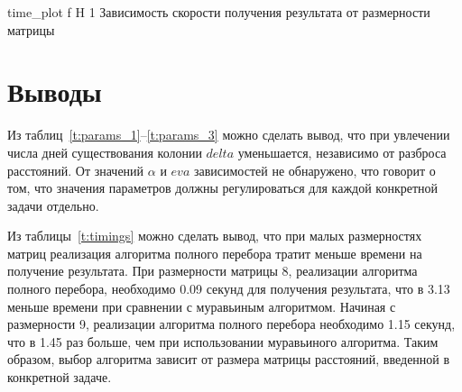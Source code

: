 {time_plot} %
{f} %
{H} %
{1\textwidth} %
{Зависимость скорости получения результата от размерности матрицы} %

\section*{Выводы}
Из таблиц~\ref{t:params_1}--\ref{t:params_3} можно сделать вывод, что при увлечении числа дней существования колонии $delta$ уменьшается, независимо от разброса расстояний. От значений $\alpha$ и $eva$ зависимостей не обнаружено, что говорит о том, что значения параметров должны регулироваться для каждой конкретной задачи отдельно. 

Из таблицы~\ref{t:timings} можно сделать вывод, что при малых размерностях матриц реализация алгоритма полного перебора тратит меньше времени на получение результата.
При размерности матрицы 8, реализации алгоритма полного перебора, необходимо 0.09 секунд для получения результата, что в 3.13 меньше времени при сравнении с муравьиным алгоритмом.
Начиная с размерности 9, реализации алгоритма полного перебора необходимо 1.15 секунд, что в 1.45 раз больше, чем при использовании муравьиного алгоритма.
Таким образом, выбор алгоритма зависит от размера матрицы расстояний, введенной в конкретной задаче.







